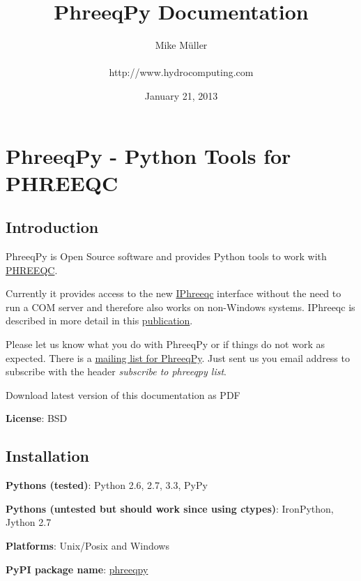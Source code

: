 \documentclass[letterpaper,10pt,english]{sphinxmanual}
\title{PhreeqPy Documentation}
\date{January 21, 2013}
\author{Mike Müller\\\\ http://www.hydrocomputing.com}
\begin{document}
\maketitle
\tableofcontents
{}\label{contents::doc}



\chapter{PhreeqPy - Python Tools for PHREEQC}
\label{index:full-phreecpy-documentation}\label{index:toc}\label{index::doc}\label{index:phreeqpy-python-tools-for-phreeqc}

\section{Introduction}
\label{index:introduction}
PhreeqPy is Open Source software and provides Python tools to work with
\href{http://wwwbrr.cr.usgs.gov/projects/GWC\_coupled/phreeqc/index.html}{PHREEQC}.

Currently it provides access to the new \href{ftp://brrftp.cr.usgs.gov/pub/charlton/iphreeqc/IPhreeqc.pdf}{IPhreeqc} interface without the need to
run a COM server and therefore also works on non-Windows systems.
IPhreeqc is described in more detail in this \href{http://www.sciencedirect.com/science/article/pii/S0098300411000653}{publication}.

Please let us know what you do with PhreeqPy or if things do not work
as expected. There is a
\href{https://groups.google.com/forum/\#!forum/phreeqpy-users}{mailing list for PhreeqPy}.
Just sent us you email address to subscribe with the header \emph{subscribe to phreeqpy list}.

Download latest version of this documentation as PDF

\textbf{License}: BSD


\section{Installation}
\label{index:installation}\label{index:id1}
\textbf{Pythons (tested)}: Python 2.6, 2.7, 3.3, PyPy

\textbf{Pythons (untested but should work since using ctypes)}: IronPython, Jython 2.7

\textbf{Platforms}: Unix/Posix and Windows

\textbf{PyPI package name}: \href{http://pypi.python.org/pypi/phreeqpy}{phreeqpy}
\end{document}
